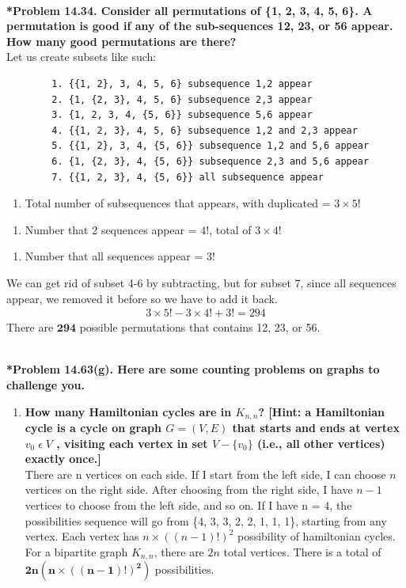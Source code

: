\documentclass{article}
\begin{document}
    \noindent\\[0.25in]
    \noindent \textbf{*Problem 14.34. Consider all permutations of \{1, 2, 3, 4, 5, 6\}. A permutation is good if any of the sub-sequences 12, 23, or 56 appear. How many good permutations are there?}
    \\ Let us create subsets like such:
    \begin{verbatim}
        1. {{1, 2}, 3, 4, 5, 6} subsequence 1,2 appear
        2. {1, {2, 3}, 4, 5, 6} subsequence 2,3 appear
        3. {1, 2, 3, 4, {5, 6}} subsequence 5,6 appear
        4. {{1, 2, 3}, 4, 5, 6} subsequence 1,2 and 2,3 appear
        5. {{1, 2}, 3, 4, {5, 6}} subsequence 1,2 and 5,6 appear
        6. {1, {2, 3}, 4, {5, 6}} subsequence 2,3 and 5,6 appear
        7. {{1, 2, 3}, 4, {5, 6}} all subsequence appear
    \end{verbatim}
    \begin{enumerate}[label=1-3: ]
        \item Total number of subsequences that appears, with duplicated = $3 \times 5!$
    \end{enumerate}
    \begin{enumerate}[label=4-6: ]
        \item Number that 2 sequences appear = $4!$, total of $3 \times 4!$
    \end{enumerate}
    \begin{enumerate}[label=7: ]
        \item Number that all sequences appear = $3!$
    \end{enumerate}
    We can get rid of subset 4-6 by subtracting, but for subset 7, since all sequences appear, we removed it before so we have to add it back.
    \begin{align*}
        3 \times 5! - 3 \times 4! + 3! = 294
    \end{align*}
    There are {\LARGE $\boxed{\mathbf{294}}$} possible permutations that contains 12, 23, or 56.

    \noindent\\[0.25in]
    \noindent\textbf{*Problem 14.63(g). Here are some counting problems on graphs to challenge you.}
    \begin{enumerate}[label=(g)]
        \item \textbf{How many Hamiltonian cycles are in $K_{n,n}$? [Hint: a Hamiltonian cycle is a cycle on
        graph $G = (V, E)$ that starts and ends at vertex $v_0\;\epsilon\;V$ , visiting each vertex in set
        $V-\{v_0\}$ (i.e., all other vertices) exactly once.]}
        \\ There are n vertices on each side. If I start from the left side, I can choose $n$ vertices on the right side.
        After choosing from the right side, I have $n-1$ vertices to choose from the left side, and so on. If I have n = 4, the
        possibilities sequence will go from \{4, 3, 3, 2, 2, 1, 1, 1\}, starting from any vertex. Each vertex has $n \times ((n-1)!)^2$
        possibility of hamiltonian cycles. For a bipartite graph $K_{n,n}$, there are $2n$ total vertices. There is a total of {\LARGE $\boxed{\mathbf{2n(n\times((n-1)!)^2)}}$} possibilities.
    \end{enumerate}
\end{document}
